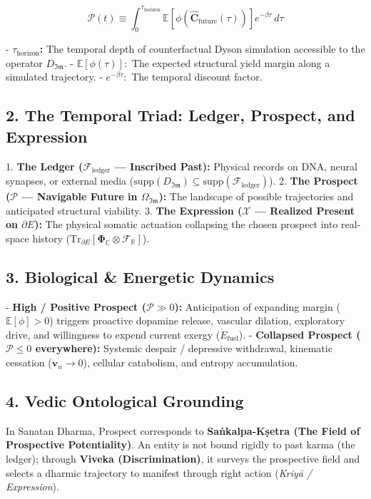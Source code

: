 \documentclass[11pt,a4paper]{article}
\theoremstyle{definition}
\theoremstyle{remark}
\begin{document}
\begin{equation}
\mathcal{P}(t) \equiv \int_0^{\tau_{\text{horizon}}} \mathbb{E}[ \phi\left( \hat{\mathbf{C}}_{\text{future}}(\tau) \right) ] e^{-\beta \tau} \, d\tau
\end{equation}


- \textbf{$\tau_{\text{horizon}}$:} The temporal depth of counterfactual Dyson simulation accessible to the operator $D_{\mathfrak{Im}}$.
- \textbf{$\mathbb{E}[\phi(\tau)]:$} The expected structural yield margin along a simulated trajectory.
- \textbf{$e^{-\beta \tau}:$} The temporal discount factor.

\subsection{2. The Temporal Triad: Ledger, Prospect, and Expression}
1. \textbf{The Ledger ($\mathcal{F}_{\text{ledger}}$ — Inscribed Past):} Physical records on DNA, neural synapses, or external media ($\mathrm{supp}(D_{\mathfrak{Im}}) \subseteq \mathrm{supp}(\mathcal{F}_{\text{ledger}})$).
2. \textbf{The Prospect ($\mathcal{P}$ — Navigable Future in $\Omega_{\mathfrak{Im}}$):} The landscape of possible trajectories and anticipated structural viability.
3. \textbf{The Expression ($\boldsymbol{\mathcal{X}}$ — Realized Present on $\partial E$):} The physical somatic actuation collapsing the chosen prospect into real-space history ($\mathrm{Tr}_{\partial E}[\mathbf{\Phi}_{\mathbb{C}} \otimes \mathcal{F}_{\mathbb{R}}]$).

\subsection{3. Biological \& Energetic Dynamics}
- \textbf{High / Positive Prospect ($\mathcal{P} \gg 0$):} Anticipation of expanding margin ($\mathbb{E}[\phi] > 0$) triggers proactive dopamine release, vascular dilation, exploratory drive, and willingness to expend current exergy ($\dot{E}_{\text{fuel}}$).
- \textbf{Collapsed Prospect ($\mathcal{P} \le 0$ everywhere):} Systemic despair / depressive withdrawal, kinematic cessation ($\mathbf{v}_n \to 0$), cellular catabolism, and entropy accumulation.

\subsection{4. Vedic Ontological Grounding}
In Sanatan Dharma, Prospect corresponds to \textbf{Saṅkalpa-Kṣetra (The Field of Prospective Potentiality)}. An entity is not bound rigidly to past karma (the ledger); through \textbf{Viveka (Discrimination)}, it surveys the prospective field and selects a dharmic trajectory to manifest through right action (\textit{Kriyā / Expression}).
\end{document}
